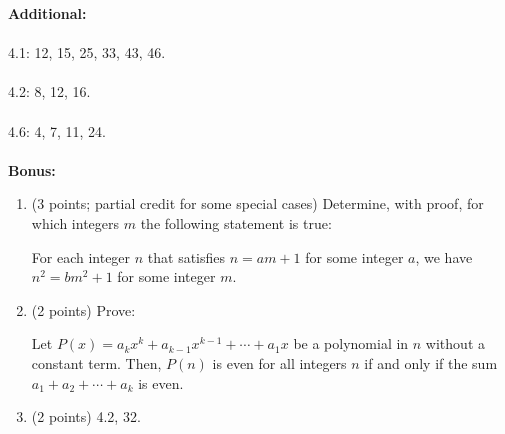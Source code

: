 \documentclass[12pt]{article}
\begin{document}
{\bf Additional:}
\\
\\
4.1: 12, 15, 25, 33, 43, 46.
\\
\\
4.2: 8, 12, 16.
\\
\\
4.6: 4, 7, 11, 24.
\\
\\
{\bf Bonus:}
\begin{enumerate}
\item (3 points; partial credit for some special cases)
Determine, with proof, for which integers $m$ the following statement is true:

For each integer $n$ that satisfies $n = am + 1$ for some integer $a$, we have
$n^2 = bm^2 + 1$ for some integer $m$.

\item (2 points)
Prove:

Let $P(x) = a_k x^k + a_{k - 1} x^{k - 1} + \cdots + a_1 x$ be a polynomial in $n$ without a constant term.
Then, $P(n)$ is even for all integers $n$ if and only if the sum $a_1 + a_2 + \cdots + a_k$ is even.

\item (2 points) 4.2, 32.

\end{enumerate}
\end{document}
